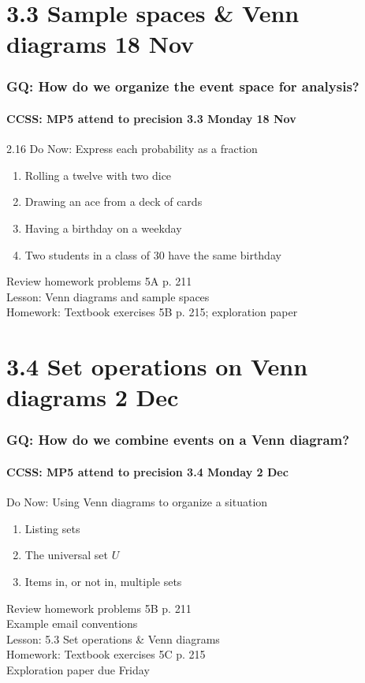 \documentclass{beamer}
\begin{document}
\section{3.3 Sample spaces \& Venn diagrams 18 Nov}
\frame
{
  \frametitle{GQ: How do we organize the event space for analysis?}
  \framesubtitle{CCSS: MP5 attend to precision \hfill \alert{3.3 Monday 18 Nov}}

  \begin{block}{2.16 Do Now: Express each probability as a fraction}
  \begin{enumerate}
    \item Rolling a twelve with two dice
    \item Drawing an ace from a deck of cards
    \item Having a birthday on a weekday
    \item Two students in a class of 30 have the same birthday
  \end{enumerate}
  \end{block}
  Review homework problems 5A p. 211 \\
  Lesson: Venn diagrams and sample spaces \\ \smallskip
  Homework: Textbook exercises 5B p. 215; exploration paper
}

\section{3.4 Set operations on Venn diagrams 2 Dec}
\frame
{
  \frametitle{GQ: How do we combine events on a Venn diagram?}
  \framesubtitle{CCSS: MP5 attend to precision \hfill \alert{3.4 Monday 2 Dec}}

  \begin{block}{Do Now: Using Venn diagrams to organize a situation}
  \begin{enumerate}
    \item Listing sets
    \item The universal set $U$
    \item Items in, or not in, multiple sets
  \end{enumerate}
  \end{block}
  Review homework problems 5B p. 211 \\
  Example email conventions \\
  Lesson: 5.3 Set operations \& Venn diagrams \\ \smallskip
  Homework: Textbook exercises 5C p. 215 \\
  Exploration paper \alert{due Friday}
}
\end{document}
